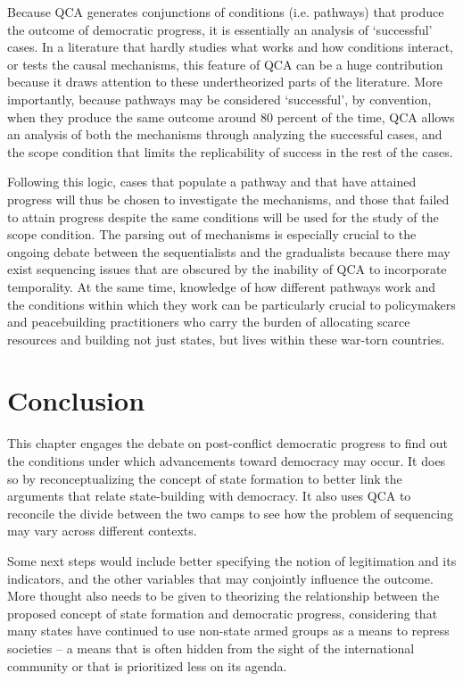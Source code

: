 \documentclass [11pt]{article}
\begin{document}
Because QCA generates conjunctions of conditions (i.e. pathways) that produce the outcome of democratic progress, it is essentially an analysis of `successful' cases. In a literature that hardly studies what works and how conditions interact, or tests the causal mechanisms, this feature of QCA can be a huge contribution because it draws attention to these undertheorized parts of the literature. More importantly, because pathways may be considered `successful', by convention, when they produce the same outcome around 80 percent of the time, QCA allows an analysis of both the mechanisms through analyzing the successful cases, and the scope condition that limits the replicability of success in the rest of the cases.

Following this logic, cases that populate a pathway and that have attained progress will thus be chosen to investigate the mechanisms, and those that failed to attain progress despite the same conditions will be used for the study of the scope condition. The parsing out of mechanisms is especially crucial to the ongoing debate between the sequentialists and the gradualists because there may exist sequencing issues that are obscured by the inability of QCA to incorporate temporality. At the same time, knowledge of how different pathways work and the conditions within which they work can be particularly crucial to policymakers and peacebuilding practitioners who carry the burden of allocating scarce resources and building not just states, but lives within these war-torn countries.

\section*{Conclusion}

This chapter engages the debate on post-conflict democratic progress to find out the conditions under which advancements toward democracy may occur. It does so by reconceptualizing the concept of state formation to better link the arguments that relate state-building with democracy. It also uses QCA to reconcile the divide between the two camps to see how the problem of sequencing may vary across different contexts.

Some next steps would include better specifying the notion of legitimation and its indicators, and the other variables that may conjointly influence the outcome. More thought also needs to be given to theorizing the relationship between the proposed concept of state formation and democratic progress, considering that many states have continued to use non-state armed groups as a means to repress societies -- a means that is often hidden from the sight of the international community or that is prioritized less on its agenda.
\end{document}
